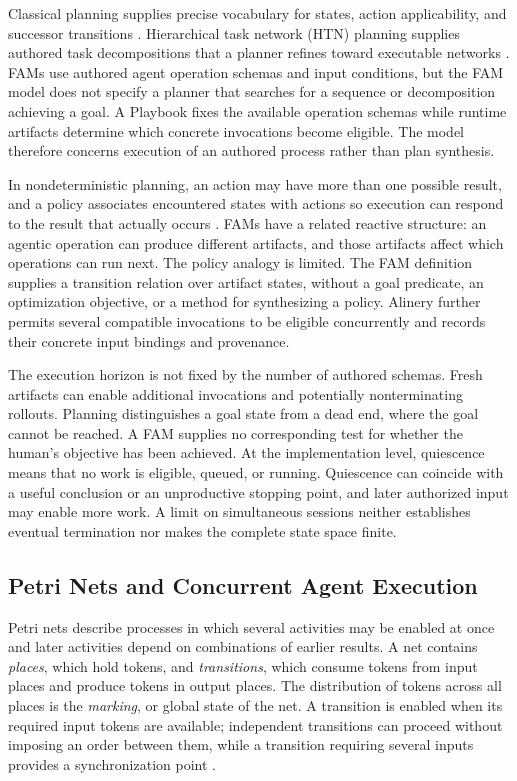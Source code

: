 \documentclass[letterpaper]{article}
\theoremstyle{definition}
\begin{document}
Classical planning supplies precise vocabulary for states, action
applicability, and successor transitions \cite{fikes1971strips}. Hierarchical
task network (HTN) planning supplies authored task decompositions that a
planner refines toward executable networks \cite{erol1994htn}. FAMs use
authored agent operation schemas and input conditions, but the FAM model does
not specify a planner that searches for a sequence or decomposition achieving
a goal. A Playbook fixes the available operation schemas while runtime
artifacts determine which concrete invocations become eligible. The model
therefore concerns execution of an authored process rather than plan
synthesis.

In nondeterministic planning, an action may have more than one possible
result, and a policy associates encountered states with actions so execution
can respond to the result that actually occurs
\cite{kuter2004nondeterministic}. FAMs have a related reactive structure:
an agentic operation can produce different artifacts, and those artifacts
affect which operations can run next. The policy analogy is limited. The FAM
definition supplies a transition relation over artifact states, without a
goal predicate, an optimization objective, or a method for synthesizing a
policy. Alinery further permits several compatible invocations to be eligible
concurrently and records their concrete input bindings and provenance.

The execution horizon is not fixed by the number of authored schemas.
Fresh artifacts can enable additional invocations and potentially
nonterminating rollouts. Planning distinguishes a goal state from a dead end,
where the goal cannot be reached. A FAM supplies no corresponding test for
whether the human's objective has been achieved. At the implementation level,
quiescence means that no work is eligible, queued, or running. Quiescence can
coincide with a useful conclusion or an unproductive stopping point, and later
authorized input may enable more work. A limit on simultaneous sessions
neither establishes eventual termination nor makes the complete state space
finite.

\subsection{Petri Nets and Concurrent Agent Execution}

Petri nets describe processes in which several activities may be enabled at
once and later activities depend on combinations of earlier results. A net
contains \emph{places}, which hold tokens, and \emph{transitions}, which consume
tokens from input places and produce tokens in output places. The distribution
of tokens across all places is the \emph{marking}, or global state of the net.
A transition is enabled when its required input tokens are available;
independent transitions can proceed without imposing an order between them,
while a transition requiring several inputs provides a synchronization point
\cite{jensen1994coloured}.
\end{document}
